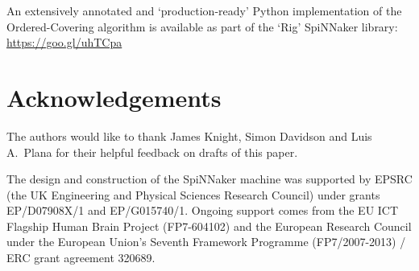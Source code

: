 \documentclass[conference]{IEEEtran}
\begin{document}
\noindent An extensively annotated and `production-ready' Python implementation of the Ordered-Covering algorithm is available as part of the `Rig' SpiNNaker library: \url{https://goo.gl/uhTCpa}

\section*{Acknowledgements}
\small The authors would like to thank James Knight, Simon Davidson and Luis A.\ Plana for their helpful feedback on drafts of this paper.

The design and construction of the SpiNNaker machine was supported by EPSRC (the UK Engineering and Physical Sciences Research Council) under grants EP/D07908X/1 and EP/G015740/1.
Ongoing support comes from the EU ICT Flagship Human Brain Project (FP7-604102) and the European Research Council under the European Union's Seventh Framework Programme (FP7/2007-2013) / ERC grant agreement 320689.

\printbibliography
\end{document}
